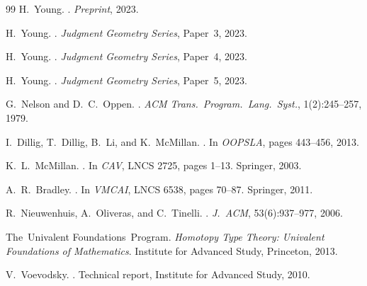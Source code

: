 \documentclass[11pt]{article}
\begin{document}
\begin{thebibliography}{99}
H.~Young.
.
\newblock \emph{Preprint}, 2023.

H.~Young.
.
\newblock \emph{Judgment Geometry Series}, Paper~3, 2023.

H.~Young.
.
\newblock \emph{Judgment Geometry Series}, Paper~4, 2023.

H.~Young.
.
\newblock \emph{Judgment Geometry Series}, Paper~5, 2023.

G.~Nelson and D.~C.~Oppen.
.
\newblock \emph{ACM Trans.\ Program.\ Lang.\ Syst.}, 1(2):245--257, 1979.

I.~Dillig, T.~Dillig, B.~Li, and K.~McMillan.
.
\newblock In \emph{OOPSLA}, pages 443--456, 2013.

K.~L.~McMillan.
.
\newblock In \emph{CAV}, LNCS 2725, pages 1--13. Springer, 2003.

A.~R.~Bradley.
.
\newblock In \emph{VMCAI}, LNCS 6538, pages 70--87. Springer, 2011.

R.~Nieuwenhuis, A.~Oliveras, and C.~Tinelli.
.
\newblock \emph{J.\ ACM}, 53(6):937--977, 2006.

The~Univalent Foundations~Program.
\newblock \emph{Homotopy Type Theory: Univalent Foundations of Mathematics}.
\newblock Institute for Advanced Study, Princeton, 2013.

V.~Voevodsky.
.
\newblock Technical report, Institute for Advanced Study, 2010.
\end{thebibliography}
\end{document}
